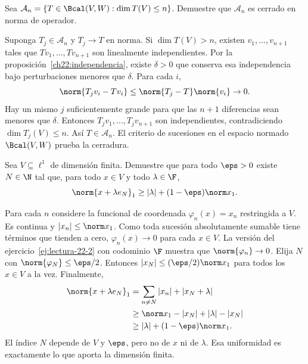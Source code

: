 \begin{ejercicio}\label{ej:lectura-22-3}
Sea $\mathcal A_n=\{T\in\Bcal(V,W):\dim T(V)\leq n\}$. Demuestre que $\mathcal A_n$ es cerrado en norma de operador.
\end{ejercicio}
\begin{solucion}
Suponga $T_j\in\mathcal A_n$ y $T_j\to T$ en norma. Si $\dim T(V)>n$, existen $v_1,\ldots,v_{n+1}$ tales que $Tv_1,\ldots,Tv_{n+1}$ son linealmente independientes. Por la proposición~\ref{ch22:independencia}, existe $\delta>0$ que conserva esa independencia bajo perturbaciones menores que $\delta$. Para cada $i$,
\[
 \norm{T_jv_i-Tv_i}\leq\norm{T_j-T}\norm{v_i}\to0.
\]
Hay un mismo $j$ suficientemente grande para que las $n+1$ diferencias sean menores que $\delta$. Entonces $T_jv_1,\ldots,T_jv_{n+1}$ son independientes, contradiciendo $\dim T_j(V)\leq n$. Así $T\in\mathcal A_n$. El criterio de sucesiones en el espacio normado $\Bcal(V,W)$ prueba la cerradura.
\end{solucion}

\begin{ejercicio}\label{ej:lectura-22-6}
Sea $V\subseteq\ell^1$ de dimensión finita. Demuestre que para todo $\eps>0$ existe $N\in\N$ tal que, para todo $x\in V$ y todo $\lambda\in\F$,
\[
 \norm{x+\lambda e_N}_1\geq|\lambda|+(1-\eps)\norm x_1.
\]
\end{ejercicio}
\begin{solucion}
Para cada $n$ considere la funcional de coordenada $\varphi_n(x)=x_n$ restringida a $V$. Es continua y $|x_n|\leq\norm x_1$. Como toda sucesión absolutamente sumable tiene términos que tienden a cero, $\varphi_n(x)\to0$ para cada $x\in V$. La versión del ejercicio~\ref{ej:lectura-22-2} con codominio $\F$ muestra que $\norm{\varphi_n}\to0$. Elija $N$ con $\norm{\varphi_N}\leq\eps/2$. Entonces $|x_N|\leq(\eps/2)\norm x_1$ para todos los $x\in V$ a la vez. Finalmente,
\begin{align*}
 \norm{x+\lambda e_N}_1
 &=\sum_{n\ne N}|x_n|+|x_N+\lambda|\\
 &\geq\norm x_1-|x_N|+|\lambda|-|x_N|\\
 &\geq|\lambda|+(1-\eps)\norm x_1.
\end{align*}
El índice $N$ depende de $V$ y $\eps$, pero no de $x$ ni de $\lambda$. Esa uniformidad es exactamente lo que aporta la dimensión finita.
\end{solucion}

